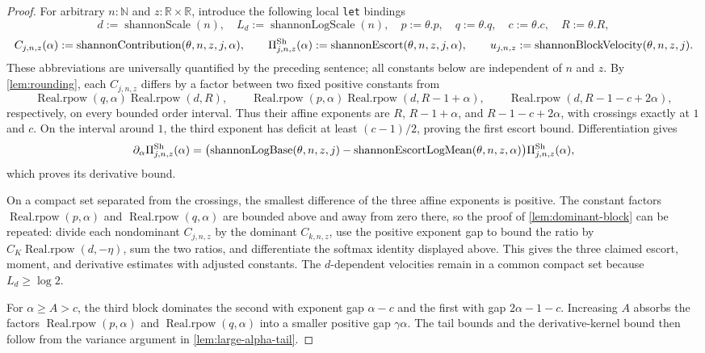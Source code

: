 \documentclass[9pt]{extarticle}
\theoremstyle{definition}
\theoremstyle{remark}
\newcommand{\R}{\mathbb R}
\newcommand{\N}{\mathbb N}
\begin{document}
\begin{proof}
For arbitrary $n:\N$ and $z:\R\times\R$, introduce the following local
\texttt{let} bindings
\[
 d:=\operatorname{shannonScale}(n),\quad
 L_d:=\operatorname{shannonLogScale}(n),\quad
 p:=\theta.p,\quad q:=\theta.q,\quad c:=\theta.c,\quad R:=\theta.R,
\]
\[
 C_{j,n,z}(\alpha):=\operatorname{shannonContribution}(\theta,n,z,j,\alpha),
 \qquad
 \Pi^{\rm Sh}_{j,n,z}(\alpha):=
   \operatorname{shannonEscort}(\theta,n,z,j,\alpha),
 \qquad
 u_{j,n,z}:=\operatorname{shannonBlockVelocity}(\theta,n,z,j).
\]
These abbreviations are universally quantified by the preceding sentence;
all constants below are independent of $n$ and $z$.  By
\cref{lem:rounding}, each $C_{j,n,z}$ differs by a factor between two fixed
positive constants from
\[
 \operatorname{Real.rpow}(q,\alpha)\operatorname{Real.rpow}(d,R),\qquad
 \operatorname{Real.rpow}(p,\alpha)
   \operatorname{Real.rpow}(d,R-1+\alpha),\qquad
 \operatorname{Real.rpow}(d,R-1-c+2\alpha),
\]
respectively, on every bounded order interval.  Thus their affine exponents
are $R$, $R-1+\alpha$, and $R-1-c+2\alpha$, with crossings exactly at
$1$ and $c$.  On the interval around $1$, the third exponent has deficit at
least $(c-1)/2$, proving the first escort bound.  Differentiation gives
\[
 \partial_\alpha\Pi^{\rm Sh}_{j,n,z}(\alpha)
 =\bigl(\operatorname{shannonLogBase}(\theta,n,z,j)
  -\operatorname{shannonEscortLogMean}(\theta,n,z,\alpha)\bigr)
   \Pi^{\rm Sh}_{j,n,z}(\alpha),
\]
which proves its derivative bound.

On a compact set separated from the crossings, the smallest difference of
the three affine exponents is positive.  The constant factors
$\operatorname{Real.rpow}(p,\alpha)$ and
$\operatorname{Real.rpow}(q,\alpha)$ are bounded above and away from zero
there, so the proof of
\cref{lem:dominant-block} can be repeated: divide each nondominant
$C_{j,n,z}$ by the dominant $C_{k,n,z}$, use the positive exponent gap to bound
the ratio by $C_K\operatorname{Real.rpow}(d,-\eta)$, sum the two ratios, and
differentiate the
softmax identity displayed above.  This gives the three claimed escort,
moment, and derivative estimates with adjusted constants.  The
$d$-dependent velocities remain in a common compact set because
$L_d\geq\log2$.

For $\alpha\geq A>c$, the third block dominates the second with exponent gap
$\alpha-c$ and the first with gap $2\alpha-1-c$.  Increasing $A$ absorbs
the factors $\operatorname{Real.rpow}(p,\alpha)$ and
$\operatorname{Real.rpow}(q,\alpha)$ into a smaller positive gap
$\gamma\alpha$.  The tail bounds and the derivative-kernel bound then follow
from the variance argument in \cref{lem:large-alpha-tail}.


\end{proof}
\end{document}
